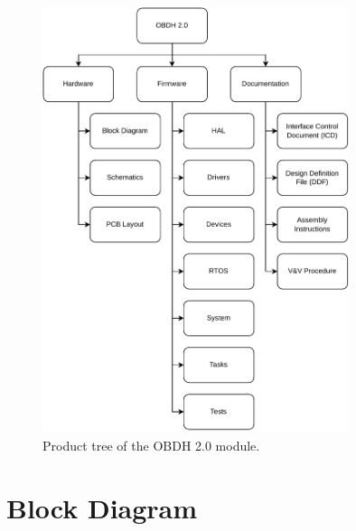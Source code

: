 \begin{figure}[!ht]
    \begin{center}
        \includegraphics[width=0.8\textwidth]{figures/product-tree.pdf}
        \caption{Product tree of the OBDH 2.0 module.}
        \label{fig:product-tree}
    \end{center}
\end{figure}

\section{Block Diagram}

